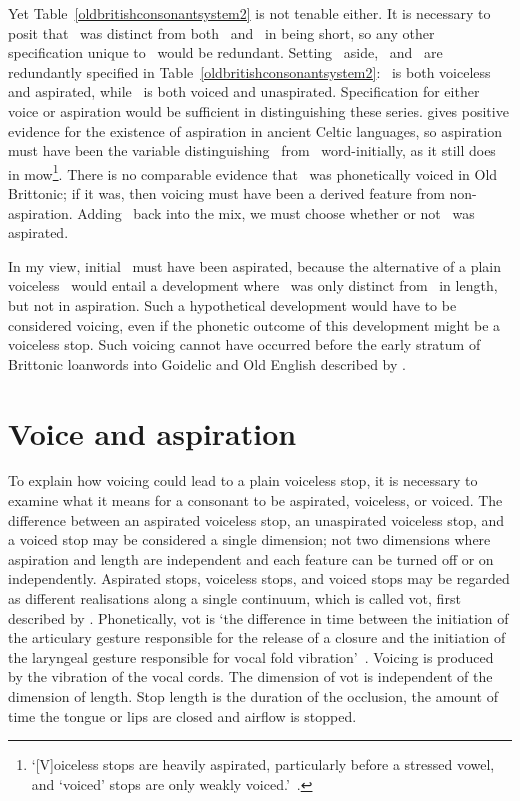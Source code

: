 Yet Table~\ref{oldbritishconsonantsystem2} is not tenable either. It is necessary to posit that \lT\ was distinct from both \xT\ and \xD\ in being short, so any other specification unique to \lT\ would be redundant. Setting \lT\ aside, \xT\ and \xD\ are redundantly specified in Table~\ref{oldbritishconsonantsystem2}: \xT\ is both voiceless and aspirated, while \xD\ is both voiced and unaspirated. Specification for either voice or aspiration would be sufficient in distinguishing these series. \Textcite{koch_*cothairche_1990} gives positive evidence for the existence of aspiration in ancient Celtic languages, so aspiration must have been the variable distinguishing \xT\ from \xD\ word-initially, as it still does in \gls{mow}\footnote{`[V]oiceless stops are heavily aspirated,
particularly before a stressed vowel, and ‘voiced’ stops are only weakly voiced.'~\autocite[368]{Awb_Welsh09}.}. There is no comparable evidence that \xD\ was phonetically voiced in Old Brittonic; if it was, then voicing must have been a derived feature from non-aspiration. Adding \lT\ back into the mix, we must choose whether or not \lT\ was aspirated.

In my view, initial \lT\ must have been aspirated, because the alternative of a plain voiceless \lT\ would entail a development where \lT\ was only distinct from \xD\ in length, but not in aspiration. Such a hypothetical development would have to be considered voicing, even if the phonetic outcome of this development might be a voiceless stop. Such voicing cannot have occurred before the early stratum of Brittonic loanwords into Goidelic and Old English described by \textcite{koch_*cothairche_1990}.

\section{Voice and aspiration}
\label{sec:voice-aspiration}
To explain how voicing could lead to a plain voiceless stop, it is necessary to examine what it means for a consonant to be aspirated, voiceless, or voiced. The difference between an aspirated voiceless stop, an unaspirated voiceless stop, and a voiced stop may be considered a single dimension; not two dimensions where aspiration and length are independent and each feature can be turned off or on independently. Aspirated stops, voiceless stops, and voiced stops may be regarded as different realisations along a  single continuum, which is called \gls{vot}, first described by \textcite{LA_CrossLanguage64}. Phonetically, \gls{vot} is `the difference in time between the initiation of the articulary gesture responsible for the release of a closure and the initiation of the laryngeal gesture responsible for vocal fold vibration'~\autocite[225]{CL_Variationuniversals99}. Voicing is produced by the vibration of the vocal cords. The dimension of \gls{vot} is independent of the dimension of length. Stop length is the duration of the occlusion, \ie the amount of time the tongue or lips are closed and airflow is stopped. 


